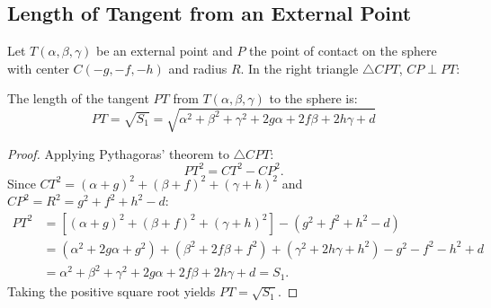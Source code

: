 \subsection{Length of Tangent from an External Point}
Let $T(\alpha, \beta, \gamma)$ be an external point and $P$ the point of contact on the sphere with center $C(-g, -f, -h)$ and radius $R$.
In the right triangle $\triangle CPT$, $CP \perp PT$:

\begin{center}
\end{center}

\begin{theorembox}
The length of the tangent $PT$ from $T(\alpha, \beta, \gamma)$ to the sphere is:
\begin{equation}
    \boxed{PT = \sqrt{S_1} = \sqrt{\alpha^2 + \beta^2 + \gamma^2 + 2g\alpha + 2f\beta + 2h\gamma + d}}
\end{equation}
\end{theorembox}

\begin{proof}
Applying Pythagoras' theorem to $\triangle CPT$:
\begin{equation}
    PT^2 = CT^2 - CP^2.
\end{equation}
Since $CT^2 = (\alpha + g)^2 + (\beta + f)^2 + (\gamma + h)^2$ and $CP^2 = R^2 = g^2 + f^2 + h^2 - d$:
\begin{align}
    PT^2 &= \left[(\alpha + g)^2 + (\beta + f)^2 + (\gamma + h)^2\right] - (g^2 + f^2 + h^2 - d) \nonumber\\
    &= (\alpha^2 + 2g\alpha + g^2) + (\beta^2 + 2f\beta + f^2) + (\gamma^2 + 2h\gamma + h^2) - g^2 - f^2 - h^2 + d \nonumber\\
    &= \alpha^2 + \beta^2 + \gamma^2 + 2g\alpha + 2f\beta + 2h\gamma + d = S_1.
\end{align}
Taking the positive square root yields $PT = \sqrt{S_1}$.
\end{proof}

